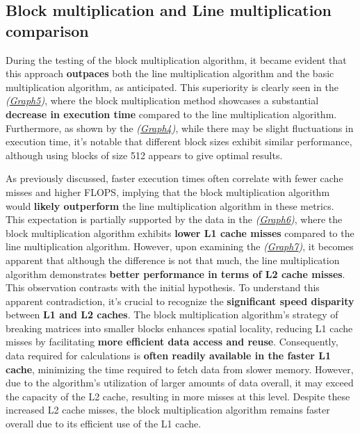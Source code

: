 \subsection{Block multiplication and Line multiplication comparison}
During the testing of the block multiplication algorithm, it
became evident that this approach \textbf{outpaces} both the line multiplication
algorithm and the basic multiplication algorithm, as anticipated.
This superiority is clearly seen in the \textit{(\hyperref[graph:BLG8]{Graph5})}, where the
block multiplication method showcases a substantial \textbf{decrease in
    execution time} compared to the line multiplication algorithm.
Furthermore, as shown by the \textit{(\hyperref[graph:BLG4]{Graph4})}, while there
may be slight fluctuations in execution time, it's notable that
different block sizes exhibit similar performance, although using blocks of
size 512 appears to give optimal results.

As previously discussed, faster execution times often correlate with fewer cache
misses and higher FLOPS, implying that the
block multiplication algorithm would \textbf{likely outperform} the line multiplication
algorithm in these metrics. This expectation is partially supported by the data in
the \textit{(\hyperref[graph:BLG6]{Graph6})}, where the block multiplication algorithm
exhibits \textbf{lower L1 cache misses} compared to the line multiplication algorithm.
However, upon examining the \textit{(\hyperref[graph:BLG7]{Graph7})},
it becomes apparent that although the difference is not that much,
the line multiplication algorithm demonstrates \textbf{better performance in terms of L2
    cache misses}. This observation contrasts with the initial hypothesis. To
understand this apparent contradiction, it's crucial to recognize the \textbf{significant
    speed disparity} between \textbf{L1 and L2 caches}. The block multiplication algorithm's
strategy of breaking matrices into smaller blocks enhances spatial locality,
reducing L1 cache misses by facilitating \textbf{more efficient data access and reuse}.
Consequently, data required for calculations is \textbf{often readily available in the
    faster L1 cache}, minimizing the time required to fetch data from slower memory.
However, due to the algorithm's utilization of larger amounts of data overall,
it may exceed the capacity of the L2 cache, resulting in more misses at this
level. Despite these increased L2 cache misses, the block multiplication
algorithm remains faster overall due to its efficient use of the L1 cache.

